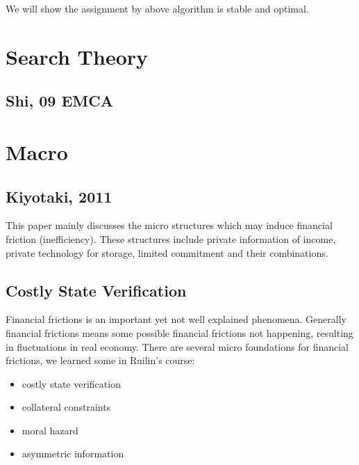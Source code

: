 \documentclass{book}
\theoremstyle{plain}
\theoremstyle{definition}
\begin{document}
We will show the assignment by above algorithm is stable and optimal.





\chapter{Search Theory} %
\label{cha:search_theory}

\section{Shi, 09 EMCA} %
\label{sec:shi_09_emca}







\chapter{Macro} %
\label{cha:chapter_name}


\section{Kiyotaki, 2011} %
\label{sec:kiyotaki_2011}

\textbf{}

This paper mainly discusses the micro structures which may induce financial friction (inefficiency). These structures include private information of income, private technology for storage, limited commitment and their combinations.





\section{Costly State Verification} %
\label{sec:costly_state_verification}

Financial frictions is an important yet not well explained phenomena. Generally financial frictions means some possible financial frictions not happening, resulting in fluctuations in real economy. There are several micro foundations for financial frictions, we learned some in Ruilin's course:
\begin{itemize}
	\item costly state verification
	\item collateral constraints
	\item moral hazard
	\item asymmetric information
\end{itemize}
\end{document}
